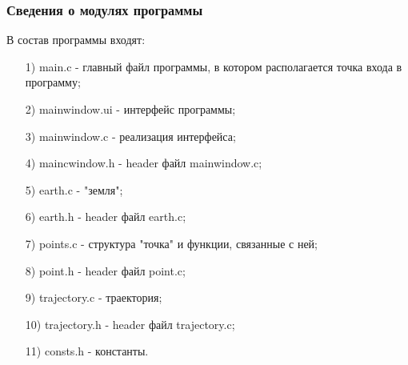\documentclass[14pt, a4paper]{extarticle}
\begin{document}
	\subsubsection{Сведения о модулях программы}
	В состав программы входят:
	\begin{itemize}
		\item[1)] main.c - главный файл программы, в котором располагается точка входа в программу;
		\item[2)] mainwindow.ui - интерфейс программы;
		\item[3)] mainwindow.c - реализация интерфейса;
		\item[4)] maincwindow.h - header файл mainwindow.c;
		\item[5)] earth.c - "земля";
		\item[6)] earth.h - header файл earth.c;
		\item[7)] points.c - структура "точка" и функции, связанные с ней;
		\item[8)] point.h - header файл point.c;
		\item[9)] trajectory.c - траектория;
		\item[10)] trajectory.h - header файл trajectory.c;
		\item[11)] consts.h - константы.	 	
	\end{itemize}

	\newpage
\end{document}
